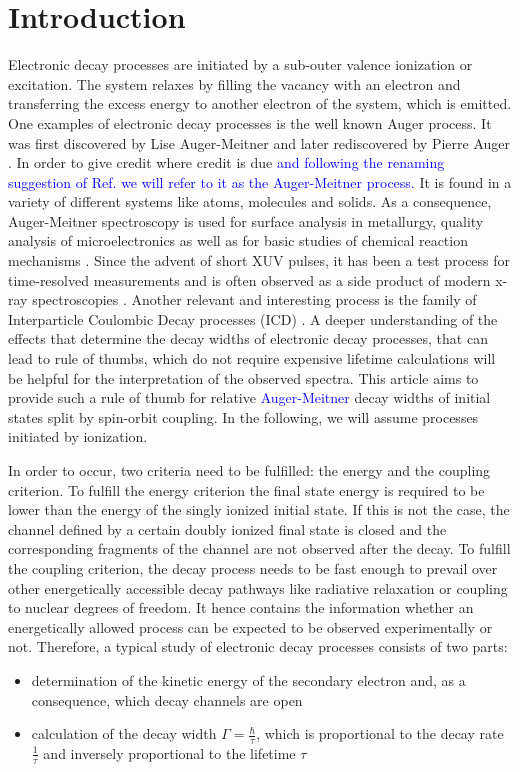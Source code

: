 \section{Introduction}
Electronic decay processes are initiated by a sub-outer valence ionization
or excitation. The system relaxes by filling the vacancy with an electron and
transferring the excess energy to another electron of the system, which is emitted.
One examples of electronic decay processes is the
well known Auger process. It was first discovered
by Lise Auger-Meitner \cite{Meitner22} and later rediscovered
by Pierre Auger \cite{Auger23}. In order to give credit where credit is due
\textcolor{blue}
{and following the renaming suggestion of Ref. \cite{renameAuger19}
we will refer to it as the Auger-Meitner process.}
It is found in a variety of different systems like atoms, molecules and solids.
As a consequence, Auger-Meitner spectroscopy
is used for surface analysis in metallurgy,
quality analysis of microelectronics
as well as for basic studies of chemical reaction mechanisms \cite{AES_Seah_86}.
Since the advent of short XUV pulses, it has been a test process for
time-resolved measurements
\textcolor{blue}
{\cite{Drescher02,Smirnova03}}
and is often observed as a side product of modern x-ray spectroscopies
\cite{Greczynski20}.
Another relevant and interesting process is the family of Interparticle
Coulombic Decay processes (ICD) \cite{Cederbaum97,Hergenhahn11,Jahnke15}.
A deeper understanding of the effects that determine the decay widths
of electronic decay processes, that
can lead to rule of thumbs, which do not require expensive lifetime
calculations will
be helpful for the interpretation of the observed spectra.
This article aims to provide such a rule of thumb for relative
\textcolor{blue}
{Auger-Meitner}
decay widths
of initial states split by spin-orbit coupling.
In the following, we will assume processes initiated by ionization.

In order to occur, two criteria need to be fulfilled: the energy and the coupling
criterion.
To fulfill the energy criterion the final state energy is required
to be lower than
the energy of the singly ionized initial state. If this is not the case, the
channel defined by a certain doubly ionized final state
is closed and the corresponding fragments of the
channel are not observed after the decay.
To fulfill the coupling criterion, the decay process needs to be fast enough
to prevail over other energetically accessible decay pathways like radiative
relaxation or coupling to nuclear degrees of freedom.
It hence contains
the information whether an energetically allowed process can be expected
to be observed experimentally or not.
Therefore, a typical study of electronic decay processes consists of two parts:
\begin{itemize}
 \item determination of the kinetic energy of the secondary electron
       and, as a consequence, which decay channels are open
 \item calculation of the decay width $\Gamma=\frac{\hbar}{\tau}$, which
       is proportional to the decay rate $\frac{1}{\tau}$ and
       inversely proportional to the lifetime $\tau$
\end{itemize}


